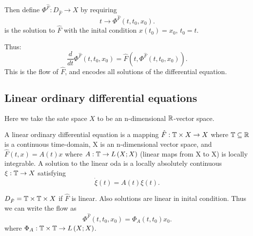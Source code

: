 		Then define $\Phi ^{\hat{F}} : D_{\hat{F}} \to X$ by requiring 
			\[
				t \to \Phi ^{\hat{F}}\left( t, t_{0}, x_0 \right) 
			.\] 
			is the solution to $\hat{F}$ with the inital condition $x\left( t_0 \right)  = x_0$, $t_0 = t$. 

			Thus:
\[
	\frac{d}{dt}\Phi ^{\hat{F}}\left( t, t_0, x_0 \right)  = \hat{F}\left( t, \Phi ^{\hat{F}}\left( t, t_0, x_0 \right)  \right) 
.\] 
This is the flow of $\hat{F}$, and encodes all solutions of the differential equation. 


\subsection{Linear ordinary differential equations}

Here we take the sate space $X$ to be an n-dimensional $\mathbb{R}$-vector space. 

\begin{definition}
	A linear ordinary differential equation is a mapping $\hat{F} : \mathbb{T} \times  X \to X$ where $\mathbb{T} \subseteq \mathbb{R} $ is a continuous time-domain, X is an n-dimensional vector space, and $\hat{F}\left( t, x \right) = A\left( t \right) x$ where $A : \mathbb{T} \to L\left( X;X \right) $ (linear maps from X to X) is locally integrable. A solution to the linear oda is a locally absolutely continuous $\xi  : \mathbb{T} \to X$ satisfying 
	\[
		\dot{\xi  } \left( t \right)  = A\left( t \right) \xi  \left( t \right) 
	.\] 
	
\end{definition}
\begin{fact}
	$D_{\hat{F}} = \mathbb{T} \times  \mathbb{T} \times  X$ if $\hat{F}$ is linear. Also solutions are linear in inital condition. Thus we can write the flow as
	\[
		\Phi ^{\hat{F}}\left( t, t_0, x_0 \right)  = \Phi _{A} \left( t, t_0 \right) x_0
	.\] 
	where $\Phi _{A} : \mathbb{T}\times \mathbb{T} \to L\left( X;X \right) $. 
\end{fact}
